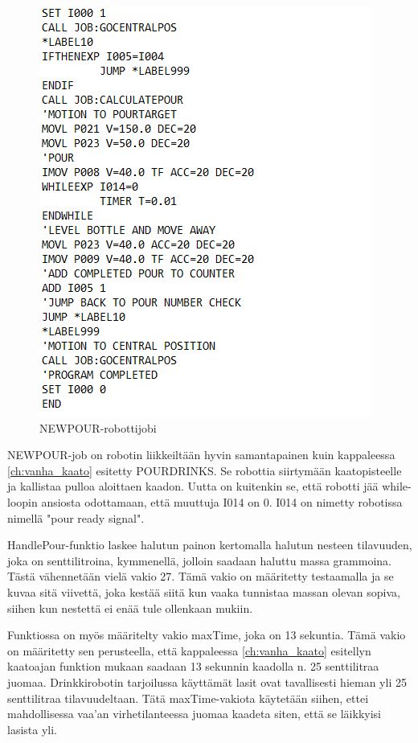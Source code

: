 \begin{figure}[h]
\begin{center}
\includegraphics[scale=0.8]{img/NEWPOUR.png}
\end{center}
\caption{NEWPOUR-robottijobi}
\label{fig:NEWPOUR}
\end{figure}
\newpage

NEWPOUR-job on robotin liikkeiltään hyvin samantapainen kuin kappaleessa \ref{ch:vanha_kaato} esitetty POURDRINKS. Se robottia siirtymään kaatopisteelle ja kallistaa pulloa aloittaen kaadon. Uutta on kuitenkin se, että robotti jää while-loopin ansiosta odottamaan, että muuttuja I014 on 0. I014 on nimetty robotissa nimellä "pour ready signal".

HandlePour-funktio laskee halutun painon kertomalla halutun nesteen tilavuuden, joka on senttilitroina, kymmenellä, jolloin saadaan haluttu massa grammoina. Tästä vähennetään vielä vakio 27. Tämä vakio on määritetty testaamalla ja se kuvaa sitä viivettä, joka kestää siitä kun vaaka tunnistaa massan olevan sopiva, siihen kun nestettä ei enää tule ollenkaan mukiin.

Funktiossa on myös määritelty vakio maxTime, joka on 13 sekuntia. Tämä vakio on määritetty sen perusteella, että kappaleessa \ref{ch:vanha_kaato} esitellyn kaatoajan funktion mukaan saadaan 13 sekunnin kaadolla n. 25 senttilitraa juomaa. Drinkkirobotin tarjoilussa käyttämät lasit ovat tavallisesti hieman yli 25 senttilitraa tilavuudeltaan. Tätä maxTime-vakiota käytetään siihen, ettei mahdollisessa vaa'an virhetilanteessa juomaa kaadeta siten, että se läikkyisi lasista yli.

